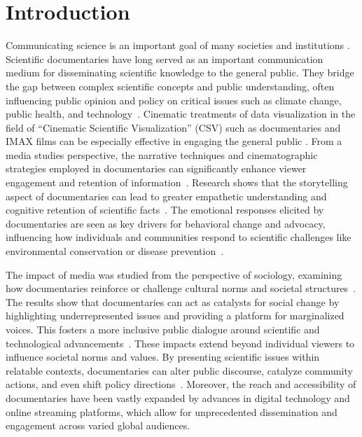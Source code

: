 \section{Introduction}
Communicating science is an important goal of many societies and institutions \citep[e.g.,][]{national2017communicating}. 
Scientific documentaries have long served as an important communication medium for disseminating scientific knowledge to the general public. They bridge the gap between complex scientific concepts and public understanding, often influencing public opinion and policy on critical issues such as climate change, public health, and technology~\citep{barnes2008,punzo2015,vogt2016,borkiewicz2019cinematic,ytini}. 
Cinematic treatments of data visualization in the field of ``Cinematic Scientific Visualization'' (CSV) \citep{borkiewicz2022introducing} such as documentaries and IMAX films can be especially effective in engaging the general public \citep{dubeck2004fantastic,arroio2010,franconeri2021science,lee2022affective}.
From a media studies perspective, the narrative techniques and cinematographic strategies employed in documentaries can significantly enhance viewer engagement and retention of information~\cite{barrett2008assessing,yeo2018inconvenient,saputra2022impactful}. 
Research shows that the storytelling aspect of documentaries can lead to greater empathetic understanding and cognitive retention of scientific facts~\cite{ginting2024effects,gaunkar2022exploring}. The emotional responses elicited by documentaries are seen as key drivers for behavioral change and advocacy, influencing how individuals and communities respond to scientific challenges like environmental conservation or disease prevention~\cite{bieniek2019communicating}.

The impact of media was studied from the perspective of sociology, examining how documentaries reinforce or challenge cultural norms and societal structures~\cite{rezapour2017classification,diesner2015social}. The results show that documentaries can act as catalysts for social change by highlighting underrepresented issues and providing a platform for marginalized voices. This fosters a more inclusive public dialogue around scientific and technological advancements~\cite{bouzoubaa2024euphoria,conrad2022breaking,diesner2016assessing}.
These impacts extend beyond individual viewers to influence societal norms and values. By presenting scientific issues within relatable contexts, documentaries can alter public discourse, catalyze community actions, and even shift policy directions~\cite{atakav2024impact}. Moreover, the reach and accessibility of documentaries have been vastly expanded by advances in digital technology and online streaming platforms, which allow for unprecedented dissemination and engagement across varied global audiences.

